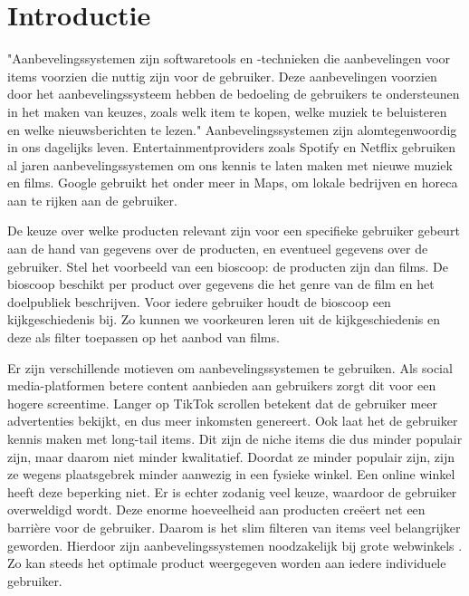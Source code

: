 \chapter{Introductie}

"Aanbevelingssystemen zijn softwaretools en -technieken die aanbevelingen voor items voorzien die nuttig zijn voor de gebruiker. Deze aanbevelingen voorzien door het aanbevelingssysteem hebben de bedoeling de gebruikers te ondersteunen in het maken van keuzes, zoals welk item te kopen, welke muziek te beluisteren en welke nieuwsberichten te lezen." \cite{recsys_handbook}
Aanbevelingssystemen zijn alomtegenwoordig in ons dagelijks leven. Entertainmentproviders zoals Spotify en Netflix gebruiken al jaren aanbevelingssystemen om ons kennis te laten maken met nieuwe muziek en films. Google gebruikt het onder meer in Maps, om lokale bedrijven en horeca aan te rijken aan de gebruiker.

De keuze over welke producten relevant zijn voor een specifieke gebruiker gebeurt aan de hand van gegevens over de producten, en eventueel gegevens over de gebruiker. Stel het voorbeeld van een bioscoop: de producten zijn dan films. De bioscoop beschikt per product over gegevens die het genre van de film en het doelpubliek beschrijven. Voor iedere gebruiker houdt de bioscoop een kijkgeschiedenis bij. Zo kunnen we voorkeuren leren uit de kijkgeschiedenis en deze als filter toepassen op het aanbod van films.

Er zijn verschillende motieven om aanbevelingssystemen te gebruiken. Als social media-platformen betere content aanbieden aan gebruikers zorgt dit voor een hogere screentime. Langer op TikTok scrollen betekent dat de gebruiker meer advertenties bekijkt, en dus meer inkomsten genereert. \cite{tiktokalgorithm}
Ook laat het de gebruiker kennis maken met long-tail items. Dit zijn de niche items die dus minder populair zijn, maar daarom niet minder kwalitatief. Doordat ze minder populair zijn, zijn ze wegens plaatsgebrek minder aanwezig in een fysieke winkel. Een online winkel heeft deze beperking niet. Er is echter zodanig veel keuze, waardoor de gebruiker overweldigd wordt. Deze enorme hoeveelheid aan producten creëert net een barrière voor de gebruiker. \cite{paradox_choice} Daarom is het slim filteren van items veel belangrijker geworden. Hierdoor zijn aanbevelingssystemen noodzakelijk bij grote webwinkels \cite{rise_of_recsys_in_ecommerce}. Zo kan steeds het optimale product weergegeven worden aan iedere individuele gebruiker. \cite{cursus_hs2}

